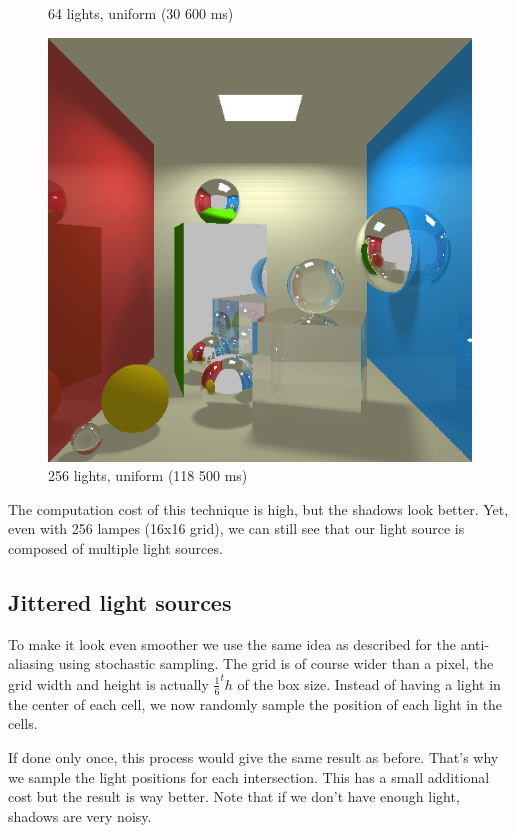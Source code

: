 \begin{figure}[H]
    \caption{64 lights, uniform (30 600 ms)}
\endminipage\hfill
{}
    \centering
    \includegraphics[width=\linewidth]{img/shadows/256.png}
    \caption{256 lights, uniform (118 500 ms)}
\endminipage\hfill
\end{figure}

The computation cost of this technique is high, but the shadows look better. Yet, even with 256 lampes (16x16 grid), we can still see that our light source is composed of multiple light sources.


\subsection{Jittered light sources}
To make it look even smoother we use the same idea as described for the anti-aliasing using stochastic sampling. The grid is of course wider than a pixel, the grid width and height is actually $\frac{1}{6}^th$ of the box size. Instead of having a light in the center of each cell, we now randomly sample the position of each light in the cells.

If done only once, this process would give the same result as before. That's why we sample the light positions for each intersection. This has a small additional cost but the result is way better. Note that if we don't have enough light, shadows are very noisy.


